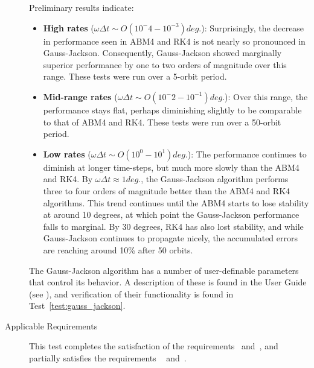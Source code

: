 \begin{description}
Preliminary results indicate:
\begin{itemize}
 \item \textbf{High rates} ($\omega \Delta t \sim O(10^-4 - 10^{-3}) deg.$): 
 \newline Surprisingly, the decrease in performance seen in ABM4 and RK4 is 
 not nearly so pronounced in Gauss-Jackson.  Consequently, Gauss-Jackson 
 showed marginally superior performance by one to two orders of magnitude 
 over 
 this range.  These tests were run over a 5-orbit period.
 \item \textbf{Mid-range rates} ($\omega \Delta t \sim O(10^-2 - 10^{-1}) 
 deg.$): 
 \newline Over this range, the performance stays flat, perhaps diminishing 
 slightly to be comparable to that of ABM4 and RK4.  These tests were run over 
 a 50-orbit period.
 \item \textbf{Low rates} ($\omega \Delta t\sim O(10^0 - 10^{1}) deg.$): 
 \newline
 The performance continues to diminish at longer time-steps, but much more 
 slowly than the ABM4 and RK4.  By $\omega \Delta t \approx 1 deg.$, the 
 Gauss-Jackson algorithm performs three to four orders of magnitude better 
 than the ABM4 and RK4 algorithms.  This trend continues until the ABM4 
 starts 
 to lose stability at around 10 degrees, at which point the Gauss-Jackson 
 performance falls to marginal.  By 30 degrees, RK4 has also lost stability, 
 and while Gauss-Jackson continues to propagate nicely, the accumulated 
 errors 
 are reaching around 10\% after 50 orbits.
\end{itemize}

The Gauss-Jackson algorithm has a number of user-definable parameters that 
control its behavior.  A description of these is found in the User Guide (see 
), and verification of 
their functionality is found in Test~\ref{test:gauss_jackson}.

\item[Applicable Requirements]
This test completes the satisfaction of the
requirements~
and~,
and partially satisfies the requirements 
~
and~.

\end{description}
\clearpage


